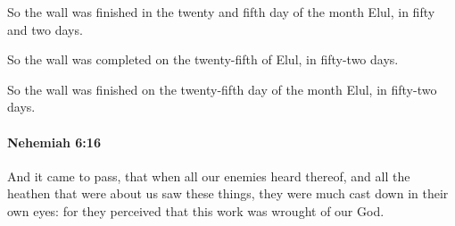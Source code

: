 			\begin{versebox}
					\item[BHS] 
					\item[LXX] 
					\item[ASV] So the wall was finished in the twenty and fifth day of the month Elul, in fifty and two days.
					\item[NIV] So the wall was completed on the twenty-fifth of Elul, in fifty-two days.
					\item[NRSV] So the wall was finished on the twenty-fifth day of the month Elul, in fifty-two days.
			\end{versebox}

		\paragraph{Nehemiah 6:16} %
			\label{NEHEMIAH-6-16}

			And it came to pass, that when all our enemies heard thereof, and all the heathen that were about us saw these things, they were much cast down in their own eyes: for they perceived that this work was wrought of our God.

